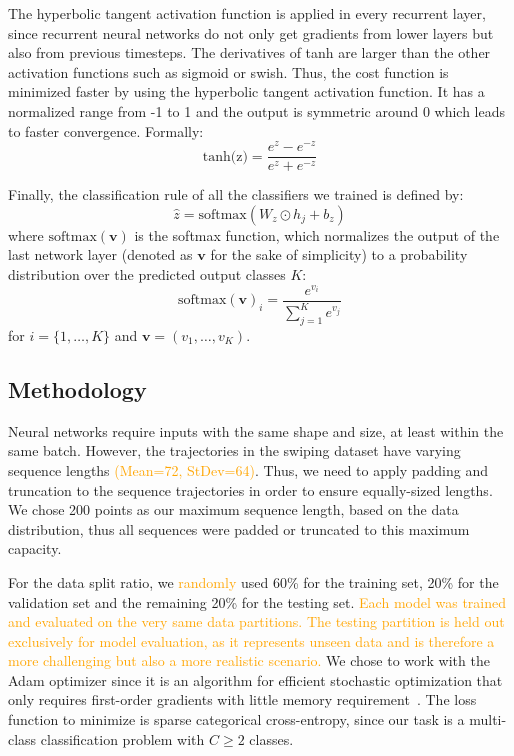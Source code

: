 \documentclass[sn-mathphys, pdflatex]{sn-jnl}
\newcommand{\rev}[1]{\textcolor{orange}{#1}}
\begin{document}
The hyperbolic tangent activation function is applied in every recurrent layer,
since recurrent neural networks do not only get gradients from lower layers but also from previous timesteps.
The derivatives of tanh are larger than the other activation functions such as sigmoid or swish.
Thus, the cost function is minimized faster by using the hyperbolic tangent activation function.
It has a normalized range from -1 to 1 and the output is symmetric around 0 which leads to faster convergence.
Formally:
\begin{equation}\label{eq:tanh}
  \text{tanh(z)} = \frac{e^{z} - e^{-z} }{e^{z} + e^{-z} }
\end{equation}

Finally, the classification rule of all the classifiers we trained is defined by:
\begin{equation}\label{eq:classification-rule}
\hat{z} = \text{softmax}(W_z \odot h_j + b_z)
\end{equation}
where $\text{softmax}(\mathbf{v})$ is the softmax function,
which normalizes the output of the last network layer
(denoted as $\mathbf{v}$ for the sake of simplicity)
to a probability distribution over the predicted output classes $K$:
\begin{equation}\label{eq:output}
  \text{softmax} ( \mathbf{v} )_{i} = \frac{e^{v_i}}{\sum _{j=1}^{K} e^{v_j}}
\end{equation}
for $i = \{1, \dots, K\}$ and $\mathbf{v} = (v_1, \dots, v_K)$. \\

\subsection{Methodology}

Neural networks require inputs with the same shape and size, at least within the same batch.
However, the trajectories in the swiping dataset have varying sequence lengths \rev{(Mean=72, StDev=64)}.
Thus, we need to apply padding and truncation to the sequence trajectories in order to ensure equally-sized lengths.
We chose 200 points as our maximum sequence length, based on the data distribution,
thus all sequences were padded or truncated to this maximum capacity.

For the data split ratio, we \rev{randomly} used 60\% for the training set, 20\% for the validation set
and the remaining 20\% for the testing set.
\rev{Each model was trained and evaluated on the very same data partitions.
The testing partition is held out exclusively for model evaluation, as it represents unseen data
and is therefore a more challenging but also a more realistic scenario.
}
We chose to work with the Adam optimizer since it is an algorithm for efficient stochastic optimization
that only requires first-order gradients with little memory requirement~\cite{Adam}.
The loss function to minimize is sparse categorical cross-entropy,
since our task is a multi-class classification problem with $C \geq 2$ classes.
\end{document}
